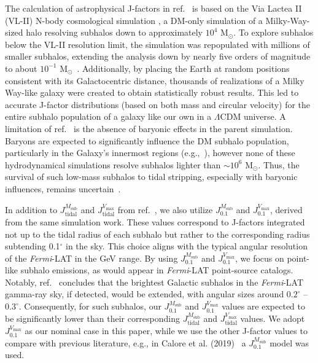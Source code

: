 \documentclass[12pt, a4paper]{article}
\newcommand{\Fermi}{\textsl{Fermi}}
\newcommand{\Msub}{M_\textrm{sub}}
\newcommand{\Vmax}{V_\textrm{max}}
\begin{document}
The calculation of astrophysical J-factors in ref.~\cite{2024MNRAS.530.2496A} is based on the Via Lactea II (VL-II) N-body cosmological simulation \cite{2007ApJ...667..859D}, a DM-only simulation of a Milky-Way-sized halo resolving subhalos down to approximately $10^4$ $\textrm{M}_{\odot}$. 
To explore subhalos below the VL-II resolution limit, 
the simulation was repopulated with millions of smaller subhalos, extending the analysis down by nearly five orders of magnitude 
to about $10^{-1}$ $\textrm{M}_{\odot}$~\cite{2022PhRvD.105h3006C}.
Additionally, by placing the Earth at random positions consistent with its Galactocentric distance, 
thousands of realizations of a Milky Way-like galaxy were created to obtain statistically robust results. 
This led to accurate J-factor distributions (based on both mass and circular velocity) for the entire subhalo population of a galaxy like our own in a $\Lambda$CDM universe. A limitation of ref.~\cite{2024MNRAS.530.2496A} is the absence of baryonic effects in the parent simulation. Baryons are expected to significantly influence the DM subhalo population, particularly in the Galaxy's innermost regions (e.g.,~\cite{2019MNRAS.487.4409K,2017MNRAS.471.1709G,2021MNRAS.501.3558G}), however none of these hydrodynamical simulations resolve subhalos lighter than $\sim 10^6$ $\textrm{M}_{\odot}$. Thus, the survival of such low-mass subhalos to tidal stripping, especially with baryonic influences, remains uncertain~\cite{2018MNRAS.474.3043V,2020MNRAS.491.4591E,2023MNRAS.518...93A}.

In addition to $J_\textrm{tidal}^{\Msub}$ and $J_\textrm{tidal}^{\Vmax}$ from ref.~\cite{2024MNRAS.530.2496A}, we also utilize $J_{0.1}^{\Msub}$ and $J_{0.1}^{\Vmax}$, derived from the same simulation work. These values correspond to J-factors integrated not up to the tidal radius of each subhalo but rather to the corresponding radius subtending 0.1$^\circ$ in the sky. 
This choice aligns with the typical angular resolution of the {\Fermi}-LAT in the GeV range. By using $J_{0.1}^{\Msub}$ and $J_{0.1}^{\Vmax}$, we focus on point-like subhalo emissions, as would appear in \Fermi-LAT point-source catalogs. 
Notably, ref.~\cite{2022PhRvD.105h3006C} concludes that the brightest Galactic subhalos in the \Fermi-LAT gamma-ray sky, if detected, would be extended, with angular sizes around $0.2^\circ$ – $0.3^\circ$. 
Consequently, for such subhalos, our $J_{0.1}^{\Msub}$ and $J_{0.1}^{\Vmax}$ values are expected to be significantly lower than their corresponding $J_\textrm{tidal}^{\Msub}$ and $J_\textrm{tidal}^{\Vmax}$ values. 
We adopt $J_{0.1}^{\Vmax}$ as our nominal case in this paper, while we use the other J-factor values to compare with previous literature, e.g., in Calore et al. (2019)~\cite{2019Galax...7...90C} a $J_{0.1}^{M_\textrm{sub}}$ model was used.
\end{document}
